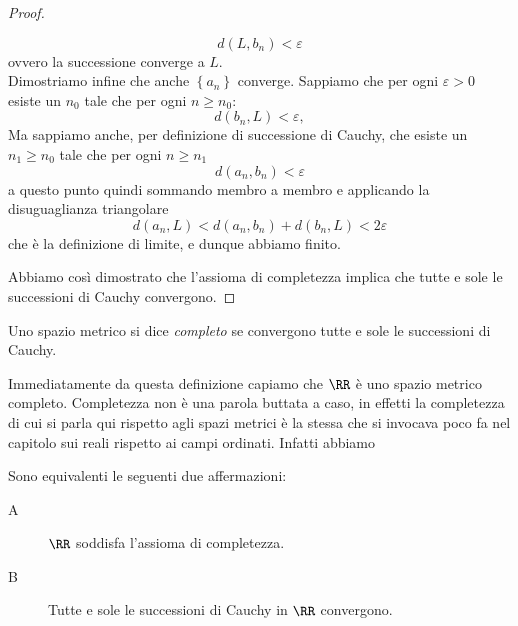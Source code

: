 \documentclass[11pt]{scrartcl}
\begin{document}
\begin{proof}
\begin{description}
			$$d(L,b_n)<\varepsilon$$
			ovvero la successione converge a $L$. \\
			Dimostriamo infine che anche $\left\{a_n\right\}$ converge. Sappiamo che per ogni $\varepsilon>0$ esiste un $n_0$ tale che per ogni $n\ge n_0$:
			$$d(b_n,L)<\varepsilon,$$
			Ma sappiamo anche, per definizione di successione di Cauchy, che esiste un $n_1\ge n_0$ tale che per ogni $n\ge n_1$
			$$d(a_n,b_n)<\varepsilon$$
			a questo punto quindi sommando membro a membro e applicando la disuguaglianza triangolare
			$$d(a_n,L)<d(a_n,b_n)+d(b_n,L)<2\varepsilon$$
			che è la definizione di limite, e dunque abbiamo finito.
		\end{description}
		Abbiamo così dimostrato che l'assioma di completezza implica che tutte e sole le successioni di Cauchy convergono.
	\end{proof}
	\begin{definition}
		Uno spazio metrico si dice \textit{completo} se convergono tutte e sole le successioni di Cauchy.
	\end{definition}
	Immediatamente da questa definizione capiamo che $\RR$ è uno spazio metrico completo. Completezza non è una parola buttata a caso, in effetti la completezza di cui si parla qui rispetto agli spazi metrici è la stessa che si invocava poco fa nel capitolo sui reali rispetto ai campi ordinati.
	Infatti abbiamo
	\begin{theorem}
		Sono equivalenti le seguenti due affermazioni:
		\begin{description}
			\item[A] $\RR$ soddisfa l'assioma di completezza.
			\item[B] Tutte e sole le successioni di Cauchy in $\RR$ convergono.
		\end{description}
	\end{theorem}
\end{document}

